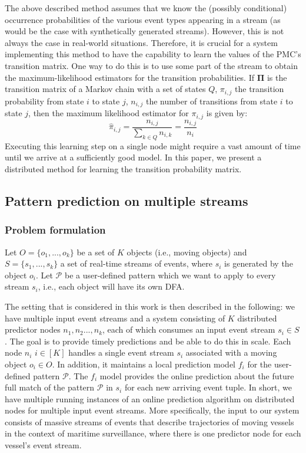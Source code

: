 The above described method assumes that we know the (possibly conditional) occurrence probabilities of the various event types appearing in a stream
(as would be the case with synthetically generated streams).
However, this is not always the case in real-world situations.
Therefore, it is crucial for a system implementing this method to have the capability to learn the values of the PMC's transition matrix.
One way to do this is to use some part of the stream to obtain the maximum-likelihood estimators for the transition probabilities. 
If $\boldsymbol{\Pi}$ is the transition matrix of a Markov chain with a set of states $Q$, 
$\pi_{i,j}$ the transition probability from state $i$ to state $j$,
$n_{i,j}$ the number of transitions from state $i$ to state $j$,
then the maximum likelihood estimator for $\pi_{i,j}$ is given by:
\begin{equation*}
\label{eq:pi_estim}
\hat{\pi}_{i,j}=\frac{n_{i,j}}{\sum_{k \in Q} n_{i,k}}=\frac{n_{i,j}}{n_{i}}
\end{equation*}
Executing this learning step on a single node might require a vast amount of time until we arrive at a sufficiently good model.
In this paper, we present a distributed method for learning the transition probability matrix.

\subsection{Pattern prediction on multiple streams}

\subsubsection{Problem formulation}
Let $O = \{ o_1, ..., o_k\}$ be a set of \emph{$K$}  objects (i.e., moving objects) 
and $S = \{ s_1, ..., s_k\}$ a set of real-time streams of events,
where $s_i$ is generated by the object $o_i$.
Let $\mathcal{P}$ be a user-defined pattern which we want to apply to every stream $s_i$,
i.e., each object will have its own DFA.

\par The setting that is considered in this work is then described in the following:
we have multiple input event streams and a system consisting of \emph{$K$} distributed predictor nodes $n_1,n_2...,n_k$, each of which consumes an input event stream $s_i\in S$. The goal is to provide timely predictions and be able to do this in scale.
Each node $n_i$ $ i \in [K]$ handles a single event stream $s_i$ associated with a moving object $o_i \in O$. In addition,  it  maintains a local prediction model $f_i$ for the user-defined pattern $\mathcal{P}$. The $f_i$ model provides the online prediction about the future full match of the pattern $\mathcal{P}$ in $s_i$  for each new arriving event tuple. In short, we have multiple running instances of an online prediction algorithm on distributed nodes for multiple input event streams. More specifically, the input to our system consists of massive streams of events  that describe trajectories of moving vessels in the context of maritime surveillance, where there is one predictor node for each vessel's event stream.
  
